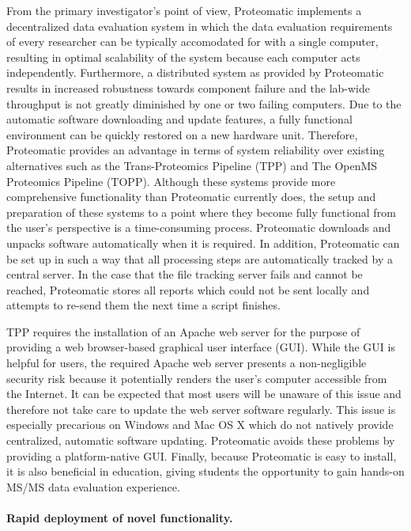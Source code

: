 From the primary investigator's point of view, Proteomatic implements a 
decentralized data evaluation system in which the data evaluation requirements
of every researcher can be typically accomodated for with a single computer,
resulting in optimal scalability of the system because each computer acts 
independently.
Furthermore, a distributed system as provided by Proteomatic results in 
increased robustness towards component failure and the lab-wide throughput
is not greatly diminished by one or two failing computers.
Due to the automatic software downloading and update features, a fully 
functional environment can be quickly restored on a new hardware unit.
Therefore, Proteomatic provides an advantage in terms of system reliability 
over existing alternatives such as the Trans-Proteomics Pipeline (TPP) and 
The OpenMS Proteomics Pipeline (TOPP).
Although these systems provide more comprehensive functionality than Proteomatic
currently does, the setup and preparation of these systems to a point where
they become fully functional from the user's perspective is a time-consuming 
process.
Proteomatic downloads and unpacks software automatically when it is required.
In addition, Proteomatic can be set up in such a way that all processing steps
are automatically tracked by a central server.
In the case that the file tracking server fails and cannot be reached, 
Proteomatic stores all reports which could not be sent locally and attempts
to re-send them the next time a script finishes.

TPP requires the installation of an Apache web server for the purpose
of providing a web browser-based graphical user interface (GUI).
While the GUI is helpful for users, the required Apache web server presents a 
non-negligible security risk because it potentially renders the user's computer 
accessible from the Internet.
It can be expected that most users will be unaware of this issue and therefore
not take care to update the web server software regularly.
This issue is especially precarious on Windows and Mac OS X which do not 
natively provide centralized, automatic software updating.
Proteomatic avoids these problems by providing a platform-native GUI.
Finally, because Proteomatic is easy to install, it is also beneficial in 
education, giving students the opportunity to gain hands-on MS/MS data 
evaluation experience.

\paragraph{Rapid deployment of novel functionality.}

